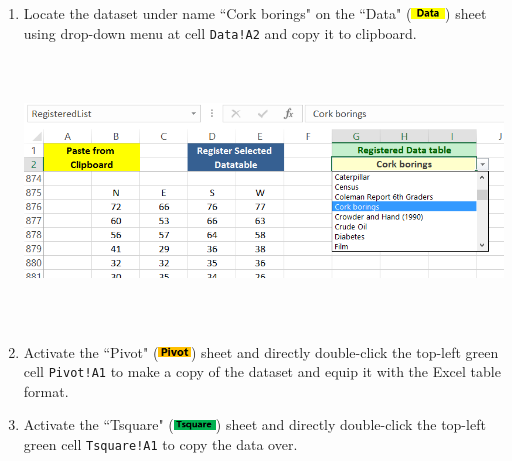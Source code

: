 \documentclass[article]{jss}
\newcommand{\shtData}{``Data" (\includegraphics[height=8pt, keepaspectratio=true]{DataSheetTab_png}) }
\newcommand{\shtPivot}{``Pivot" (\includegraphics[height=8pt, keepaspectratio=true]{PivotSheetTab_png}) }
\newcommand{\shtTsquare}{``Tsquare" (\includegraphics[height=8pt, keepaspectratio=true]{TsquareSheetTab_png}) }
\begin{document}
        
        \begin{enumerate}
                \item Locate the dataset under name ``Cork borings" on the \shtData sheet using drop-down menu at cell \texttt{Data!A2} and copy it to clipboard.
                \begin{center}
                        \includegraphics[height=200pt, keepaspectratio=true]{DataSheet_CorkBorings_png}
                \end{center}
                
                
                \item Activate the \shtPivot sheet and directly double-click the top-left green cell \texttt{Pivot!A1} to make a copy of the dataset and equip it with the Excel table format.
                
                
                \item Activate the \shtTsquare sheet and directly double-click the top-left green cell \texttt{Tsquare!A1} to copy the data over.
                

\end{enumerate}
\end{document}
